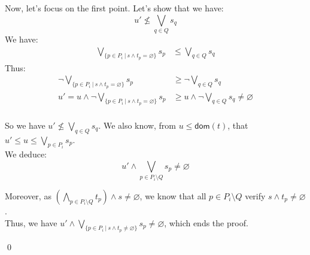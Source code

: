 \documentclass[a4paper]{article}%
\newcommand{\dom}[1]{\textsf{dom}(#1)}
\newcommand{\alt}{~|~}
\begin{document}
    
    Now, let's focus on the first point. Let's show that we have:\\
    \[ u' \not\leq\bigvee_{q\in Q}s_q \]
    We have:\\
    \begin{align*}
        \bigvee_{\{p \in P_i \alt s \land t_p = \varnothing\}}s_p &\leq \bigvee_{q \in Q}s_q
    \end{align*}
    Thus:\\
    \begin{align*}
        \neg \bigvee_{\{p \in P_i \alt s \land t_p = \varnothing\}}s_p &\geq \neg \bigvee_{q \in Q}s_q\\
        u' = u \land \neg \bigvee_{\{p \in P_i \alt s \land t_p = \varnothing\}}s_p &\geq u \land \neg \bigvee_{q \in Q}s_q \neq \varnothing\\
    \end{align*}

    So we have $ u' \not\leq\bigvee_{q\in Q}s_q $. We also know, from $u \leq \dom t$, that $u' \leq u \leq \bigvee_{p\in P_i}s_p$.\\

    We deduce:\\
    \[ u' \land \bigvee_{p\in P_i \setminus Q}s_p \neq \varnothing \]

    Moreover, as $(\bigwedge_{p\in P_i\setminus Q}t_p) \land s \neq \varnothing$, we know that all $p \in P_i \setminus Q$ verify $s \land t_p \neq \varnothing$.\\
    Thus, we have $u' \land \bigvee_{\{p\in P_i\alt s\wedge t_p\not=\varnothing\}}s_p \neq \varnothing$, which ends the proof.
    
    \qed
\end{document}
